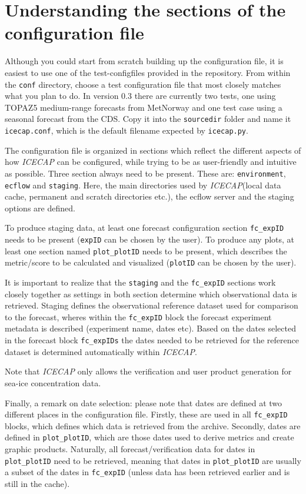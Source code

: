 \documentclass[DIV=10, parskip=full]{scrreprt}
\newcommand{\ice}{\textit{ICECAP}\xspace}
\newcommand{\version}{0.3\xspace}
\begin{document}
\section{Understanding the sections of the configuration file}
Although you could start from scratch building up the configuration file, it is easiest to use one of the test-configfiles provided in the repository. From within the \texttt{conf} directory, choose a test configuration file that most closely matches what you plan to do. In version \version there are currently two tests, one using TOPAZ5 medium-range forecasts from MetNorway and one test case using a seasonal forecast from the CDS. Copy it into the \texttt{sourcedir} folder and name it \texttt{icecap.conf}, which is the default filename expected by \texttt{icecap.py}. 


The configuration file is organized in sections which reflect the different aspects of how \ice can be configured, while trying to be as user-friendly and intuitive as possible. Three section always need to be present. These are: \texttt{environment}, \texttt{ecflow} and \texttt{staging}. Here, the main directories used by \ice (local data cache, permanent and scratch directories etc.), the ecflow server and the staging options are defined. 


To produce staging data, at least one forecast configuration section \texttt{fc\_expID} needs to be present (\texttt{expID} can be chosen by the user). To produce any plots, at least one section named \texttt{plot\_plotID} needs to be present, which describes the metric/score to be calculated and visualized (\texttt{plotID} can be chosen by the user). 

It is important to realize that the \texttt{staging} and the \texttt{fc\_expID} sections work closely together as settings in both section determine which observational data is retrieved. Staging defines the observational reference dataset used for comparison to the forecast, wheres within the \texttt{fc\_expID} block the forecast experiment metadata is described (experiment name, dates etc). Based on the dates selected in the forecast block \texttt{fc\_expIDs} the dates needed to be retrieved for the reference dataset is determined automatically within \ice.

Note that \ice only allows the verification and user product generation for sea-ice concentration data.


Finally, a remark on date selection: please note that dates are defined at two different places in the configuration file. Firstly, these are used in all \texttt{fc\_expID} blocks, which defines which data is retrieved from the archive. Secondly, dates are defined in \texttt{plot\_plotID}, which are those dates used to derive metrics and create graphic products. Naturally, all forecast/verification data for dates in \texttt{plot\_plotID} need to be retrieved, meaning that dates in \texttt{plot\_plotID} are usually a subset of the dates in \texttt{fc\_expID} (unless data has been retrieved earlier and is still in the cache).
\end{document}
